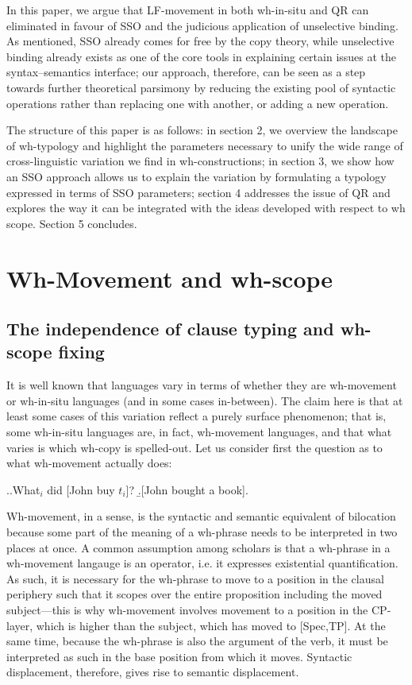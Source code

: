 \documentclass[11pt]{article}
\begin{document}
In this paper, we argue that LF-movement in both wh-in-situ and QR can eliminated in favour of SSO and the judicious application of unselective binding. As mentioned, SSO already comes for free by the copy theory, while unselective binding already exists as one of the core tools in explaining certain issues at the syntax--semantics interface; our approach, therefore, can be seen as a step towards further theoretical parsimony by reducing the existing pool of syntactic operations rather than replacing one with another, or adding a new operation.

The structure of this paper is as follows: in section 2, we overview the landscape of wh-typology and highlight the parameters necessary to unify the wide range of cross-linguistic variation we find in wh-constructions; in section 3, we show how an SSO approach allows us to explain the variation by
formulating a typology expressed in terms of SSO parameters; section 4 addresses the issue of QR and explores the way it can be integrated with the ideas developed with respect to wh scope. Section 5 concludes.


\section{Wh-Movement and wh-scope}
\subsection{The independence of clause typing and wh-scope fixing}
It is well known that languages vary in terms of whether they are wh-movement or wh-in-situ languages (and in some cases in-between). The claim here is that at least some cases of this variation reflect a purely surface phenomenon; that is, some wh-in-situ languages are, in fact, wh-movement languages, and that what varies is which wh-copy is spelled-out. Let us consider first the question as to what wh-movement actually does:

\ex.\label{wh.10}\a.\label{2.10a}What$_i$ did [John buy $t_i$]?
	\b.\label{2.10b}[John bought a book].

Wh-movement, in a sense, is the syntactic and semantic equivalent of bilocation because some part of the meaning of a wh-phrase needs to be interpreted in two places at once. A common assumption among scholars is that a wh-phrase in a wh-movement langauge is an operator, i.e. it expresses existential quantification. As such, it is necessary for the wh-phrase to move to a position in the clausal periphery such that it scopes over the entire proposition including the moved subject---this is why wh-movement involves movement to a position in the CP-layer, which is higher than the subject, which has moved to [Spec,TP]. At the same time, because the wh-phrase is also the argument of the verb, it must be interpreted as such in the base position from which it moves. Syntactic displacement, therefore, gives rise to semantic displacement.
\end{document}
